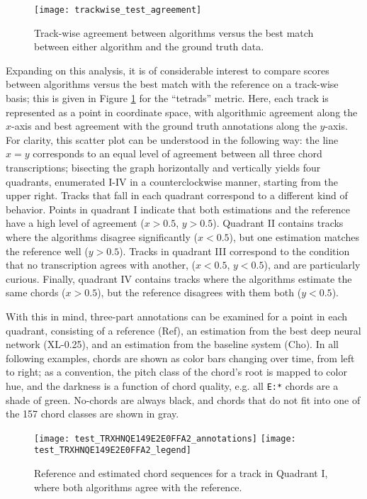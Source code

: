 \begin{figure}[t!]
\centering
\texttt{[image: trackwise\_test\_agreement]}
\caption{Track-wise agreement between algorithms versus the best match between either algorithm and the ground truth data.}
\label{fig:trackwise_test_agreement}
\end{figure}


Expanding on this analysis, it is of considerable interest to compare scores between algorithms versus the best match with the reference on a track-wise basis; this is given in Figure \ref{fig:trackwise_test_agreement} for the ``tetrads'' metric.
Here, each track is represented as a point in coordinate space, with algorithmic agreement along the $x$-axis and best agreement with the ground truth annotations along the $y$-axis.
For clarity, this scatter plot can be understood in the following way:
the line $x=y$ corresponds to an equal level of agreement between all three chord transcriptions;
bisecting the graph horizontally and vertically yields four quadrants, enumerated I-IV in a counterclockwise manner, starting from the upper right.
Tracks that fall in each quadrant correspond to a different kind of behavior.
Points in quadrant I indicate that both estimations and the reference have a high level of agreement ($x > 0.5$, $y > 0.5$).
Quadrant II contains tracks where the algorithms disagree significantly ($x < 0.5$), but one estimation matches the reference well ($y > 0.5$).
Tracks in quadrant III correspond to the condition that no transcription agrees with another, ($x < 0.5$, $y < 0.5$), and are particularly curious.
Finally, quadrant IV contains tracks where the algorithms estimate the same chords ($x > 0.5$), but the reference disagrees with them both ($y < 0.5$).


With this in mind, three-part annotations can be examined for a point in each quadrant, consisting of a reference (Ref), an estimation from the best deep neural network (XL-0.25), and an estimation from the baseline system (Cho).
In all following examples, chords are shown as color bars changing over time, from left to right;
as a convention, the pitch class of the chord's root is mapped to color hue, and the darkness is a function of chord quality, e.g. all \texttt{E:*} chords are a shade of green.
No-chords are always black, and chords that do not fit into one of the 157 chord classes are shown in gray.

\begin{figure}[t!]
\centering
\texttt{[image: test\_TRXHNQE149E2E0FFA2\_annotations]}
\texttt{[image: test\_TRXHNQE149E2E0FFA2\_legend]}
\caption{Reference and estimated chord sequences for a track in Quadrant I, where both algorithms agree with the reference.}
\label{fig:test_quadI}
\end{figure}

